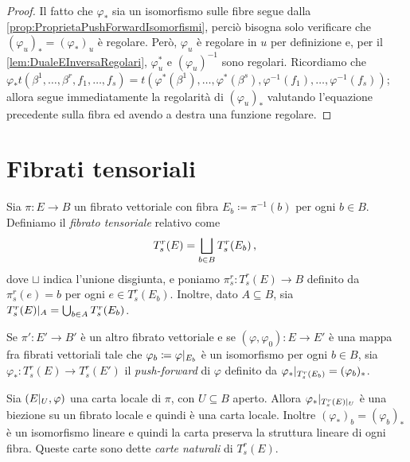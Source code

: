 \begin{proof}
	Il fatto che $\varphi_*$ sia un isomorfismo sulle fibre segue dalla \cref{prop:ProprietaPushForwardIsomorfismi}, perciò bisogna solo verificare che $(\varphi_u)_*=(\varphi_*)_u$ è regolare. Però, $\varphi_u$ è regolare in $u$ per definizione e, per il \cref{lem:DualeEInversaRegolari}, $\varphi_u^*$ e $(\varphi_u)^{-1}$ sono regolari.
	Ricordiamo che $\varphi_*t(\beta^1,\ldots,\beta^r,f_1,\ldots,f_s) = t(\varphi^*(\beta^1),\ldots,\varphi^*(\beta^s),\varphi^{-1}(f_1),\ldots,\varphi^{-1}(f_s))$; allora
	segue immediatamente la regolarità di $(\varphi_u)_*$ valutando l'equazione precedente sulla fibra ed avendo a destra una funzione regolare.
\end{proof}


\section{Fibrati tensoriali}

\begin{definition} 
	Sia $\pi:E\to B$ un fibrato vettoriale con fibra $E_b \coloneqq \pi^{-1}(b)$ per ogni $b\in B$. Definiamo il \emph{fibrato tensoriale} relativo come
	\begin{equation*}
		T_s^r(E) = \bigsqcup_{b\in B} T_s^r(E_b) \, \text{, }
	\end{equation*}
	dove $\sqcup$ indica l'unione disgiunta, e poniamo $\pi_s^r:T_s^r(E)\to B$ definito da $\pi_s^r(e) = b$ per ogni $e\in T_s^r(E_b)$.
	Inoltre, dato $A\subseteq B$, sia $T_s^r(E)|_ A = \bigcup_{b\in A} T_s^r(E_b)$.
\end{definition}

\begin{definition} 
	Se $\pi':E'\to B'$ è un altro fibrato vettoriale e se $(\varphi,\varphi_0):E\to E'$ è una mappa fra fibrati vettoriali tale che $\varphi_b \coloneqq \varphi|_{E_b}$ è un isomorfismo per ogni $b\in B$, sia $\varphi_*:T_s^r(E)\to T_s^r(E')$ il \emph{push-forward} di $\varphi$ definito da $\varphi_*|_{T_s^r(E_b)} = (\varphi_b)_*$.
\end{definition}

Sia $(E|_ U,\varphi)$ una carta locale di $\pi$, con $U\subseteq B$ aperto. Allora $\varphi_* |_{T_s^r(E)|_ U}$ è una biezione su un fibrato locale e quindi è una carta locale.
Inoltre $(\varphi_*)_b = (\varphi_b)_*$ è un isomorfismo lineare e quindi la carta preserva la struttura lineare di ogni fibra. Queste carte sono dette \emph{carte naturali} di $T_s^r(E)$.

